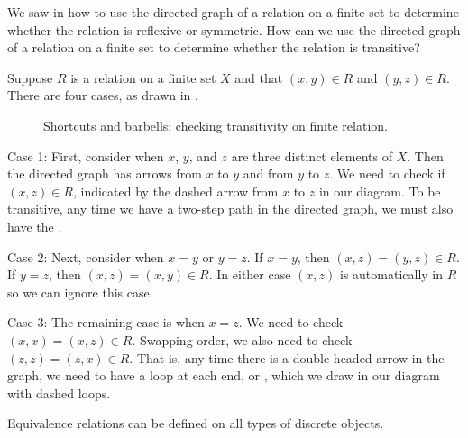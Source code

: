 \begin{exam}
\label{exam_rel_finite_not_trans}
    We saw in  how to use the directed graph of a relation on a finite set to determine whether the relation is reflexive or symmetric.  How can we use the directed graph of a relation on a finite set to determine whether the relation is transitive? 
        \begin{soln}
            Suppose $R$ is a relation on a finite set $X$ and that  $(x,y) \in R$ and $(y,z) \in R$.
            There are four cases, as drawn in .  
                \begin{figure}[hbtp]
                    \centering
                    
                    \caption{Shortcuts and barbells: checking transitivity on finite relation.}
                    \label{fig_shortcuts_barbells}
                \end{figure}

            Case 1: First, consider when $x$, $y$, and $z$ are three distinct elements of $X$.  Then the directed graph has arrows from $x$ to $y$ and from $y$ to $z$. We need to check if $(x,z) \in R$, indicated by the dashed arrow from $x$ to $z$ in our diagram.  To be transitive, any time we have a two-step path in the directed graph, we must also have the .

            Case 2: Next, consider when $x=y$ or $y=z$. If $x=y$, then $(x,z) =(y,z)\in R$.  If $y=z$, then $(x,z) =(x,y)\in R$. In either case $(x,z)$ is automatically in $R$ so we can ignore this case.

            Case 3: The remaining case is when $x = z$. We need to check $(x,x)=(x,z) \in R$.  Swapping order, we also need to check $(z,z)=(z,x)\in R$. That is, any time there is a double-headed arrow in the graph, we need to have a loop at each end, or , which we draw in our diagram with dashed loops. 
        \end{soln}
\end{exam}

Equivalence relations can be defined on all types of discrete objects.


